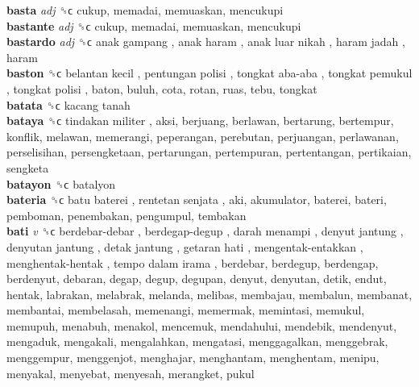 \textbf{basta} \emph{adj}  ␝ϲ  cukup, memadai, memuaskan, mencukupi  \\
\textbf{bastante} \emph{adj}  ␝ϲ  cukup, memadai, memuaskan, mencukupi  \\
\textbf{bastardo} \emph{adj}  ␝ϲ   anak gampang ,  anak haram ,  anak luar nikah ,  haram jadah , haram  \\
\textbf{baston} ␝ϲ   belantan kecil ,  pentungan polisi ,  tongkat aba-aba ,  tongkat pemukul ,  tongkat polisi , baton, buluh, cota, rotan, ruas, tebu, tongkat  \\
\textbf{batata} ␝ϲ   kacang tanah   \\
\textbf{bataya} ␝ϲ   tindakan militer , aksi, berjuang, berlawan, bertarung, bertempur, konflik, melawan, memerangi, peperangan, perebutan, perjuangan, perlawanan, perselisihan, persengketaan, pertarungan, pertempuran, pertentangan, pertikaian, sengketa  \\
\textbf{batayon} ␝ϲ  batalyon  \\
\textbf{bateria} ␝ϲ   batu baterei ,  rentetan senjata , aki, akumulator, baterei, bateri, pemboman, penembakan, pengumpul, tembakan  \\
\textbf{bati} \emph{v}  ␝ϲ   berdebar-debar ,  berdegap-degup ,  darah menampi ,  denyut jantung ,  denyutan jantung ,  detak jantung ,  getaran hati ,  mengentak-entakkan ,  menghentak-hentak ,  tempo dalam irama , berdebar, berdegup, berdengap, berdenyut, debaran, degap, degup, degupan, denyut, denyutan, detik, endut, hentak, labrakan, melabrak, melanda, melibas, membajau, membalun, membanat, membantai, membelasah, memenangi, memermak, memintasi, memukul, memupuh, menabuh, menakol, mencemuk, mendahului, mendebik, mendenyut, mengaduk, mengakali, mengalahkan, mengatasi, menggagalkan, menggebrak, menggempur, menggenjot, menghajar, menghantam, menghentam, menipu, menyakal, menyebat, menyesah, merangket, pukul  \\
